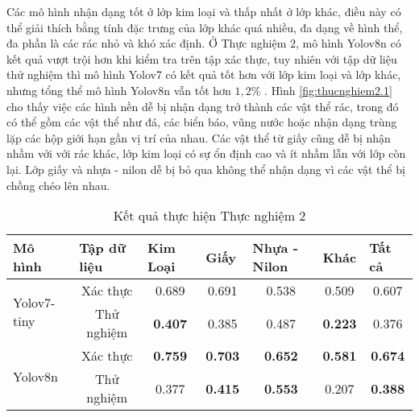 \documentclass[../the.tex]{subfiles}
\begin{document}
\bigskip

{\fontsize{13}{12} \selectfont
    Các mô hình nhận dạng tốt ở lớp kim loại và thấp nhất ở lớp khác,
    điều này có thể giải thích bằng tính đặc trưng của lớp khác quá nhiều, đa dạng về hình thể, đa phần là các rác nhỏ và khó xác định.
    Ở Thực nghiệm 2, mô hình Yolov8n có kết quả vượt trội hơn khi kiểm tra trên tập xác thực, tuy nhiên với tập dữ liệu thử nghiệm thì mô hình Yolov7 có kết quả tốt hơn với lớp kim loại và lớp khác, nhưng tổng thể mô hình Yolov8n vẫn tốt hơn $1,2\%$ .
    Hình \ref{fig:thucnghiem2.1} cho thấy việc các hình nền dễ bị nhận dạng trở thành các vật thể rác, trong đó có thể gồm các vật thể như đá, các biển báo, vũng nước hoặc nhận dạng trùng lặp các hộp giới hạn gần vị trí của nhau.
    Các vật thể từ giấy cũng dễ bị nhận nhầm với với rác khác, lớp kim loại có sự ổn định cao và ít nhầm lẫn với lớp còn lại. Lớp giấy và nhựa - nilon dễ bị bỏ qua không thể nhận dạng vì các vật thể bị chồng chéo lên nhau.
}
\begin{table}[h!]
    \centering
    \caption{Kết quả thực hiện Thực nghiệm 2}
    \begin{tabular}{|l|c|c|c|c|c|c|}
        \hline
        \textbf{Mô hình}             & \multicolumn{1}{l|}{\textbf{Tập dữ liệu}} & \multicolumn{1}{l|}{\textbf{Kim Loại}} & \multicolumn{1}{l|}{\textbf{Giấy}} & \multicolumn{1}{l|}{\textbf{Nhựa - Nilon}} & \multicolumn{1}{l|}{\textbf{Khác}} & \multicolumn{1}{l|}{\textbf{Tất cả}} \\ \hline
        \multirow{2}{*}{Yolov7-tiny} & Xác thực                                  & 0.689                                  & 0.691                              & 0.538                                      & 0.509                              & 0.607                                \\ \cline{2-7}
                                     & Thử nghiệm                                & \textbf{0.407}                          & 0.385                              & 0.487                                      & \textbf{0.223}                     & 0.376                                \\ \hline
        \multirow{2}{*}{Yolov8n}     & Xác thực                                  & \textbf{0.759}                         & \textbf{0.703}                     & \textbf{0.652}                             & \textbf{0.581}                     & \textbf{0.674}                       \\ \cline{2-7}
                                     & Thử nghiệm                                & 0.377                                  & \textbf{0.415}                     & \textbf{0.553}                             & 0.207                              & \textbf{0.388}                       \\ \hline
    \end{tabular}
    \label{tab:thucnghiem2.1}
\end{table}
\end{document}
